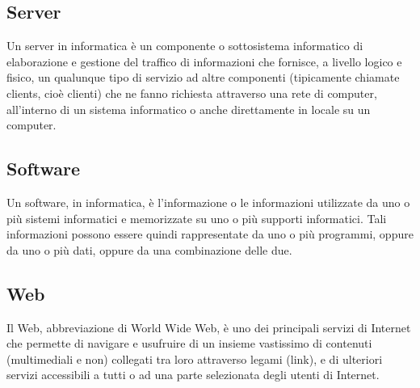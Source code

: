 \documentclass[a4paper, titlepage]{article}
\begin{document}
	\subsection{Server}
	Un server in informatica è un componente o sottosistema informatico di elaborazione e gestione del traffico di informazioni che fornisce, a livello logico e fisico, un qualunque tipo di servizio ad altre componenti (tipicamente chiamate clients, cioè clienti) che ne fanno richiesta attraverso una rete di computer, all'interno di un sistema informatico o anche direttamente in locale su un computer.
	
	\subsection{Software}
	Un software, in informatica, è l’informazione o le informazioni utilizzate da uno o più sistemi informatici
	e memorizzate su uno o più supporti informatici. Tali informazioni possono essere quindi rappresentate da uno o più programmi, oppure da uno o più dati, oppure da una combinazione
	delle due.
	
	\subsection{Web}
	Il Web, abbreviazione di World Wide Web, è uno dei principali servizi di Internet che permette di
	navigare e usufruire di un insieme vastissimo di contenuti (multimediali e non) collegati tra loro
	attraverso legami (link), e di ulteriori servizi accessibili a tutti o ad una parte selezionata degli
	utenti di Internet.
	
\end{document}
